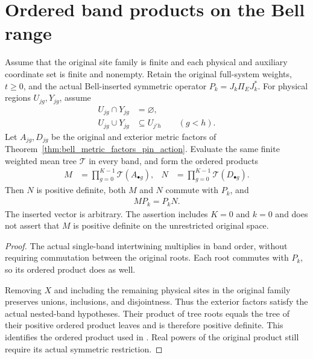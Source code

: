\section{Ordered band products on the Bell range}

\begin{theorem}
    \label{thm:bell_band_product_pin_action}
    \leanok
    Assume that the original site family is finite and each physical and
    auxiliary coordinate set is finite and nonempty.
    Retain the original full-system weights, $t\ge0$, and the actual
    Bell-inserted symmetric operator $P_k=J_k\Pi_EJ_k^*$. For physical
    regions $U_{jg},Y_{jg}$, assume
    \begin{align*}
        U_{jg}\cap Y_{jg}&=\varnothing,\\
        U_{jg}\cup Y_{jg}&\subseteq U_{j'h}\qquad(g<h).
    \end{align*}
    Let $A_{jg},D_{jg}$ be the original and exterior metric factors of
    Theorem~\ref{thm:bell_metric_factors_pin_action}. Evaluate the same
    finite weighted mean tree $\mathcal T$ in every band, and form the
    ordered products
    \begin{align*}
        M&=\prod_{g=0}^{K-1}\mathcal T(A_{\bullet g}),&
        N&=\prod_{g=0}^{K-1}\mathcal T(D_{\bullet g}).
    \end{align*}
    Then $N$ is positive definite, both $M$ and $N$ commute with $P_k$,
    and
    \begin{align*}
        MP_k=P_kN.
    \end{align*}
    The inserted vector is arbitrary. The assertion includes $K=0$
    and $k=0$ and does not assert that $M$ is positive definite on the
    unrestricted original space.
\end{theorem}
\begin{proof}\leanok
    The actual single-band intertwining multiplies in band order, without
    requiring commutation between the original roots. Each root commutes
    with $P_k$, so its ordered product does as well.

    Removing $X$ and including the remaining physical sites in the original
    family preserves unions, inclusions, and disjointness. Thus the
    exterior factors satisfy the actual nested-band hypotheses. Their
    product of tree roots equals the tree of their positive ordered
    product leaves and is therefore positive definite. This identifies
    the ordered product used in
    \cite[\texttt{07-comparators.tex}, lines 370--381]{OpenAI2026AreaLaw}.
    Real powers of the original product still require its actual
    symmetric restriction.
\end{proof}
